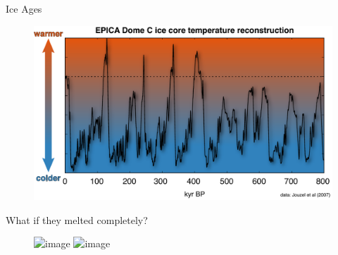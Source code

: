 \documentclass[hide notes,intlimits]{beamer}
\begin{document}
{
}

\begin{frame}{Ice Ages}
  \vspace{1.5cm}
  \begin{figure}
    \includegraphics[width=\textwidth]{epica-temp}
  \end{figure}
\end{frame}

{
}



\begin{frame}{What if they melted completely?}
  \begin{figure}
    \includegraphics<1>[width=\textwidth]{sea-level-potential-simple-01}
    \includegraphics<2>[width=\textwidth]{sea-level-potential-01}
  \end{figure}
\end{frame}
  
\end{document}
